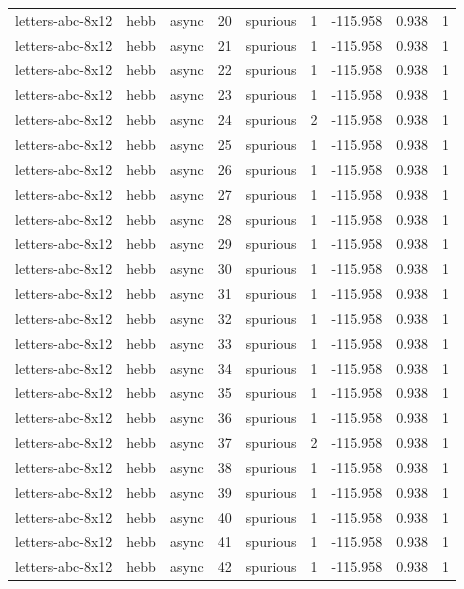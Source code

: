 \begin{tabular}{lllrlrrrr}
letters-abc-8x12 & hebb & async & 20 & spurious & 1 & -115.958 & 0.938 & 1 \\
letters-abc-8x12 & hebb & async & 21 & spurious & 1 & -115.958 & 0.938 & 1 \\
letters-abc-8x12 & hebb & async & 22 & spurious & 1 & -115.958 & 0.938 & 1 \\
letters-abc-8x12 & hebb & async & 23 & spurious & 1 & -115.958 & 0.938 & 1 \\
letters-abc-8x12 & hebb & async & 24 & spurious & 2 & -115.958 & 0.938 & 1 \\
letters-abc-8x12 & hebb & async & 25 & spurious & 1 & -115.958 & 0.938 & 1 \\
letters-abc-8x12 & hebb & async & 26 & spurious & 1 & -115.958 & 0.938 & 1 \\
letters-abc-8x12 & hebb & async & 27 & spurious & 1 & -115.958 & 0.938 & 1 \\
letters-abc-8x12 & hebb & async & 28 & spurious & 1 & -115.958 & 0.938 & 1 \\
letters-abc-8x12 & hebb & async & 29 & spurious & 1 & -115.958 & 0.938 & 1 \\
letters-abc-8x12 & hebb & async & 30 & spurious & 1 & -115.958 & 0.938 & 1 \\
letters-abc-8x12 & hebb & async & 31 & spurious & 1 & -115.958 & 0.938 & 1 \\
letters-abc-8x12 & hebb & async & 32 & spurious & 1 & -115.958 & 0.938 & 1 \\
letters-abc-8x12 & hebb & async & 33 & spurious & 1 & -115.958 & 0.938 & 1 \\
letters-abc-8x12 & hebb & async & 34 & spurious & 1 & -115.958 & 0.938 & 1 \\
letters-abc-8x12 & hebb & async & 35 & spurious & 1 & -115.958 & 0.938 & 1 \\
letters-abc-8x12 & hebb & async & 36 & spurious & 1 & -115.958 & 0.938 & 1 \\
letters-abc-8x12 & hebb & async & 37 & spurious & 2 & -115.958 & 0.938 & 1 \\
letters-abc-8x12 & hebb & async & 38 & spurious & 1 & -115.958 & 0.938 & 1 \\
letters-abc-8x12 & hebb & async & 39 & spurious & 1 & -115.958 & 0.938 & 1 \\
letters-abc-8x12 & hebb & async & 40 & spurious & 1 & -115.958 & 0.938 & 1 \\
letters-abc-8x12 & hebb & async & 41 & spurious & 1 & -115.958 & 0.938 & 1 \\
letters-abc-8x12 & hebb & async & 42 & spurious & 1 & -115.958 & 0.938 & 1 \\

\end{tabular}
